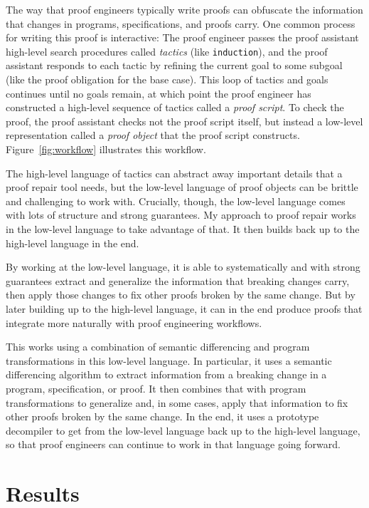 The way that proof engineers typically write proofs can obfuscate the information that changes in programs, specifications, and proofs carry.
One common process for writing this proof is interactive: The proof engineer passes the proof assistant high-level
search procedures called \textit{tactics} (like \lstinline{induction}), and the proof assistant responds to each tactic
by refining the current goal to some subgoal (like the proof obligation for the base case). This loop of tactics and goals 
continues until no goals remain, at which point the proof engineer has constructed a high-level sequence of tactics called a \textit{proof script}.
To check the proof, the proof assistant checks not the proof script itself, but instead a low-level representation called a \textit{proof object} 
that the proof script constructs.
Figure~\ref{fig:workflow} illustrates this workflow.

The high-level language of tactics can abstract away important details that a proof repair tool needs,
but the low-level language of proof objects can be brittle and challenging to work with.
Crucially, though, the low-level language comes with lots of structure and strong guarantees.
My approach to proof repair works in the low-level language to take advantage of that.
It then builds back up to the high-level language in the end.

By working at the low-level language, it is able to systematically and with strong guarantees extract and generalize the 
information that breaking changes carry,
then apply those changes to fix other proofs broken by the same change.
But by later building up to the high-level language,
it can in the end produce proofs that integrate more naturally with proof engineering workflows.

This works using a combination of semantic differencing and program transformations in this low-level language.
In particular, it uses a semantic differencing algorithm to extract information from a breaking change in a program, specification, or proof.
It then combines that with program transformations to generalize and, in some cases, apply that information to fix other 
proofs broken by the same change.
In the end, it uses a prototype decompiler to get from the low-level language back up to the high-level language,
so that proof engineers can continue to work in that language going forward. %

\section{Results}


